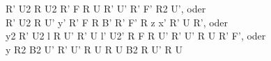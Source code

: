 R' U2 R U2 R' F R U R' U' R' F' R2 U', oder\\
R' U2 R U' y' R' F R B' R' F' R z x' R' U R', oder\\
y2 R' U2 l R U' R' U l' U2' R F R U' R' U' R U R' F', oder\\
y R2 B2 U' R' U' R U R U B2 R U' R U\\
